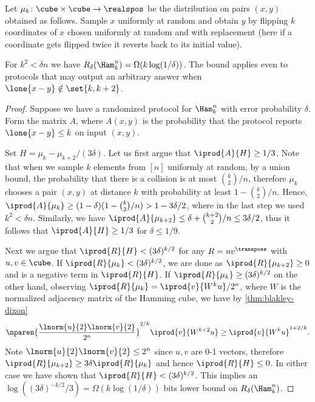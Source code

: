 Let $\mu_k\colon\cube\times\cube\to\realspos$ be the distribution
on pairs $(x,y)$ obtained as follows. Sample $x$ uniformly at random
and obtain $y$ by flipping $k$ coordinates of $x$ chosen uniformly 
at random and with replacement (here if a coordinate gets flipped 
twice it reverts back to its initial value).
\begingroup
\def\thetheorem{\ref{thm:klogdelta}}
\begin{theorem}[restated]
For $k^2<\delta n$ we have 
$R_{\delta}(\Ham^n_k) = \Omega(k\log (1/\delta))$.
The bound applies even to protocols that may
output an arbitrary answer when $\lone{x-y} \notin \set{k,k+2}$.
\end{theorem}
\addtocounter{theorem}{-1}
\endgroup
\begin{proof}
Suppose we have a randomized protocol for $\Ham^n_k$ with 
error probability $\delta$. Form the matrix $A$, where
$A(x,y)$ is the probability that the protocol reports
$\lone{x-y}\le k$ on input $(x,y)$.

Set $H = \mu_k - \mu_{k+2}/(3\delta)$. Let us first argue that
$\iprod{A}{H}\ge 1/3$. Note that when we sample $k$ elements 
from $[n]$ uniformly at random, by a union bound, the probability
that there is a collision is at most $\binom{k}{2}/n$, therefore 
$\mu_k$ chooses a pair $(x,y)$ at distance $k$ with probability 
at least $1-\binom{k}{2}/n$.
Hence,
$\iprod{A}{\mu_k} 
   \ge (1-\delta)(1-\binom{k}{2}/n)
     > 1-3\delta/2$,
where in the last step we used $k^2< \delta n$.
Similarly, we have $\iprod{A}{\mu_{k+2}} \le 
                    \delta + \binom{k+2}{2}/n \le 3\delta/2$,
thus it follows that $\iprod{A}{H}\ge 1/3$ for $\delta \le 1/9$.

Next we argue that $\iprod{R}{H}< (3\delta)^{k/2}$ for any 
$R=uv^\transpose$ with $u,v\in\cube$. If 
$\iprod{R}{\mu_k}<(3\delta)^{k/2}$, we are done as 
$\iprod{R}{\mu_{k+2}}\ge 0$ and is a negative term in 
$\iprod{R}{H}$. If $\iprod{R}{\mu_k}\ge (3\delta)^{k/2}$
on the other hand,
observing $\iprod{R}{\mu_k}=\iprod{v}{W^k u}/2^n$,
where $W$ is the normalized adjacency matrix of the Hamming cube,
we have by \autoref{thm:blakley-dixon}
\begin{align*}
\nparen{\frac{\lnorm{u}{2}\lnorm{v}{2}}{2^n}}^{2/k}
\iprod{v}{W^{k+2}u} \ge 
\iprod{v}{W^{k}u}^{1+2/k}.
\end{align*}
Note $\lnorm{u}{2}\lnorm{v}{2}\le 2^n$ since $u,v$ are 0-1 vectors,
therefore 
$\iprod{R}{\mu_{k+2}}\ge 3\delta\iprod{R}{\mu_{k}}$
and hence $\iprod{R}{H}\le 0$. In either case we have shown
that $\iprod{R}{H} < (3\delta)^{k/2}$. This implies an 
$\log((3\delta)^{-k/2} / 3) = \Omega(k\log(1/\delta))$ bits 
lower bound on $R_\delta(\Ham^n_k)$.
\end{proof}
